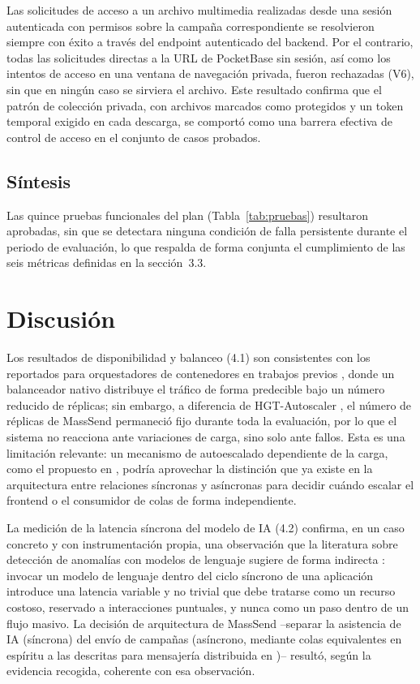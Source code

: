 Las solicitudes de acceso a un archivo multimedia realizadas desde una sesión
autenticada con permisos sobre la campaña correspondiente se resolvieron
siempre con éxito a través del endpoint autenticado del backend. Por el
contrario, todas las solicitudes directas a la URL de PocketBase sin sesión,
así como los intentos de acceso en una ventana de navegación privada, fueron
rechazadas (V6), sin que en ningún caso se sirviera el archivo. Este
resultado confirma que el patrón de colección privada, con archivos marcados
como protegidos y un token temporal exigido en cada descarga, se comportó
como una barrera efectiva de control de acceso en el conjunto de casos
probados.

\subsection{Síntesis}

Las quince pruebas funcionales del plan (Tabla~\ref{tab:pruebas}) resultaron
aprobadas, sin que se detectara ninguna condición de falla persistente
durante el periodo de evaluación, lo que respalda de forma conjunta el
cumplimiento de las seis métricas definidas en la sección~3.3.

\section{Discusión}

Los resultados de disponibilidad y balanceo (4.1) son consistentes con los
reportados para orquestadores de contenedores en trabajos previos
\cite{ref6}, donde un balanceador nativo distribuye el tráfico de forma
predecible bajo un número reducido de réplicas; sin embargo, a diferencia de
HGT-Autoscaler \cite{ref1}, el número de réplicas de MassSend permaneció fijo
durante toda la evaluación, por lo que el sistema no reacciona ante
variaciones de carga, sino solo ante fallos. Esta es una limitación
relevante: un mecanismo de autoescalado dependiente de la carga, como el
propuesto en \cite{ref1}, podría aprovechar la distinción que ya existe en la
arquitectura entre relaciones síncronas y asíncronas para decidir cuándo
escalar el frontend o el consumidor de colas de forma independiente.

La medición de la latencia síncrona del modelo de IA (4.2) confirma, en un
caso concreto y con instrumentación propia, una observación que la
literatura sobre detección de anomalías con modelos de lenguaje sugiere de
forma indirecta \cite{ref9}: invocar un modelo de lenguaje dentro del ciclo
síncrono de una aplicación introduce una latencia variable y no trivial que
debe tratarse como un recurso costoso, reservado a interacciones puntuales, y
nunca como un paso dentro de un flujo masivo. La decisión de arquitectura de
MassSend --separar la asistencia de IA (síncrona) del envío de campañas
(asíncrono, mediante colas equivalentes en espíritu a las descritas para
mensajería distribuida en \cite{ref2})-- resultó, según la evidencia
recogida, coherente con esa observación.

